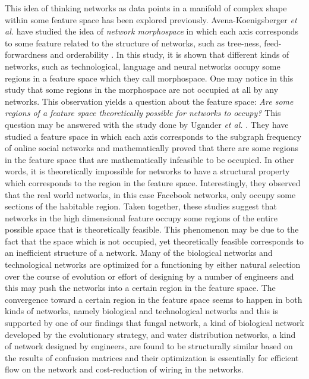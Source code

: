 \documentclass{article}
\begin{document}

This idea of thinking networks as data points in a manifold of complex shape within some feature space has been explored previously. Avena-Koenigsberger \textit{et al.} have studied the idea of \textit{network morphospace} in which each axis corresponds to some feature related to the structure of networks, such as tree-ness, feed-forwardness and orderability \cite{NetworkMorphospace}. In this study, it is shown that different kinds of networks, such as technological, language and neural networks occupy some regions in a feature space which they call morphospace. One may notice in this study that some regions in the morphospace are not occupied at all by any networks. This observation yields a question about the feature space: \textit{Are some regions of a feature space theoretically possible for networks to occupy?} This question may be answered with the study done by Ugander \textit{et al.} \cite{Ugander:2013}. They have studied a feature space in which each axis corresponds to the subgraph frequency of online social networks and mathematically proved that there are some regions in the feature space that are mathematically infeasible to be occupied. In other words, it is theoretically impossible for networks to have a structural property which corresponds to the region in the feature space. Interestingly, they observed that the real world networks, in this case Facebook networks, only occupy some sections of the habitable region. Taken together, these studies suggest that networks in the high dimensional feature occupy some regions of the entire possible space that is theoretically feasible. This phenomenon may be due to the fact that the space which is not occupied, yet theoretically feasible corresponds to an inefficient structure of a network. Many of the biological networks and technological networks are optimized for a functioning by either natural selection over the course of evolution or effort of designing by a number of engineers and this may push the networks into a certain region in the feature space. The convergence toward a certain region in the feature space seems to happen in both kinds of networks, namely biological and technological networks and this is supported by one of our findings that fungal network, a kind of biological network developed by the evolutionary strategy, and water distribution networks, a kind of network designed by engineers, are found to be structurally similar based on the results of confusion matrices and their optimization is essentially for efficient flow on the network and cost-reduction of wiring in the networks.
 
\end{document}
